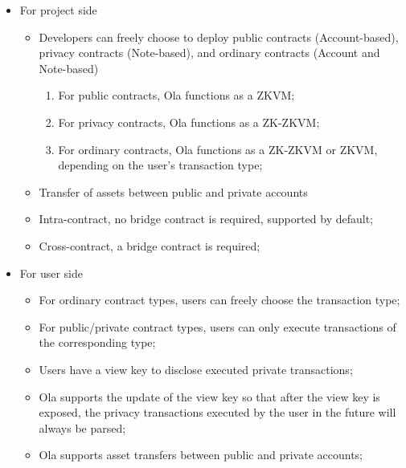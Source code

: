\begin{itemize}
\item For project side
    \begin{itemize}
    \item Developers can freely choose to deploy public contracts (Account-based), privacy contracts (Note-based), and ordinary contracts (Account and Note-based)
        \begin{enumerate}
        \item For public contracts, Ola functions as a ZKVM;
        \item For privacy contracts, Ola functions as a ZK-ZKVM;
        \item For ordinary contracts, Ola functions as a ZK-ZKVM or ZKVM, depending on the user's transaction type;
        \end{enumerate}
    \item Transfer of assets between public and private accounts
    \item Intra-contract, no bridge contract is required, supported by default;
    \item Cross-contract, a bridge contract is required;
    \end{itemize}
\item For user side
    \begin{itemize}
    \item For ordinary contract types, users can freely choose the transaction type;
    \item For public/private contract types, users can only execute transactions of the corresponding type;
    \item Users have a view key to disclose executed private transactions;
    \item Ola supports the update of the view key so that after the view key is exposed, the privacy transactions executed by the user in the future will always be parsed;
    \item Ola supports asset transfers between public and private accounts;
    \end{itemize}
\end{itemize}

